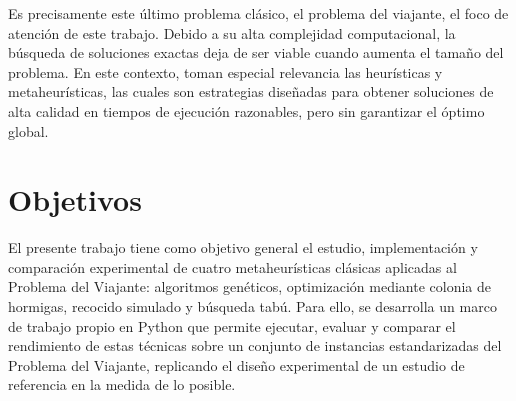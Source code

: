 Es precisamente este último problema clásico, el problema del viajante, el foco de atención de este trabajo. Debido a su alta 
complejidad computacional, la búsqueda de soluciones exactas deja de ser viable cuando aumenta el tamaño del problema. En este 
contexto, toman especial relevancia las heurísticas y metaheurísticas, las cuales son estrategias diseñadas para obtener
soluciones de alta calidad en tiempos de ejecución razonables, pero sin garantizar el óptimo global. 

\section{Objetivos}
\label{sec:obj}

El presente trabajo tiene como objetivo general el estudio, implementación y comparación experimental de cuatro 
metaheurísticas clásicas aplicadas al Problema del Viajante: algoritmos genéticos, optimización mediante colonia de hormigas,
recocido simulado y búsqueda tabú. Para ello, se desarrolla un marco de trabajo propio en Python que permite ejecutar,
evaluar y comparar el rendimiento de estas técnicas sobre un conjunto de instancias estandarizadas del Problema del Viajante,
replicando el diseño experimental de un estudio de referencia en la medida de lo posible.

